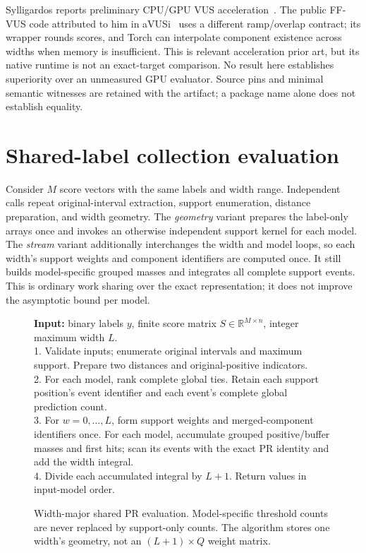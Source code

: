 Sylligardos reports preliminary CPU/GPU VUS acceleration~\cite{sylligardos2025}.
The public FF-VUS code attributed to him in aVUSi~\cite{ffvus2026} uses a
different ramp/overlap contract; its wrapper rounds scores, and Torch can
interpolate component existence across widths when memory is insufficient.
This is relevant acceleration prior art, but its native runtime is not an
exact-target comparison. No result here establishes superiority over an
unmeasured GPU evaluator. Source pins and minimal semantic witnesses are
retained with the artifact; a package name alone does not establish equality.

\section{Shared-label collection evaluation}
Consider $M$ score vectors with the same labels and width range. Independent
calls repeat original-interval extraction, support enumeration, distance
preparation, and width geometry. The \emph{geometry} variant prepares the
label-only arrays once and invokes an otherwise independent support kernel for
each model. The \emph{stream} variant additionally interchanges the width and
model loops, so each width's support weights and component identifiers are
computed once. It still builds model-specific grouped masses and integrates
all complete support events. This is ordinary work sharing over the exact
representation; it does not improve the asymptotic bound per model.

\begin{figure}[t]
\begin{minipage}{\linewidth}\small
\textbf{Input:} binary labels $y$, finite score matrix $S\in\mathbb R^{M\times n}$,
integer maximum width $L$.\\[2pt]
1. Validate inputs; enumerate original intervals and maximum support. Prepare
two distances and original-positive indicators.\\
2. For each model, rank complete global ties. Retain each support position's
event identifier and each event's complete global prediction count.\\
3. For $w=0,\ldots,L$, form support weights and merged-component identifiers
once. For each model, accumulate grouped positive/buffer masses and first hits;
scan its events with the exact PR identity and add the width integral.\\
4. Divide each accumulated integral by $L+1$. Return values in input-model order.
\end{minipage}
\caption{Width-major shared PR evaluation. Model-specific threshold counts are
never replaced by support-only counts. The algorithm stores one width's
geometry, not an $(L+1)\times Q$ weight matrix.}
\label{fig:batch}
\end{figure}

